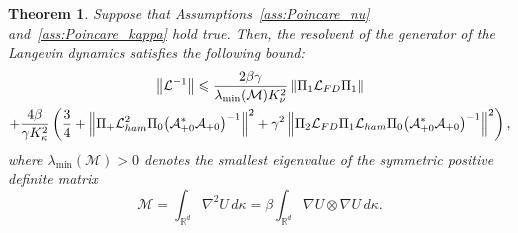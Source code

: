 \documentclass[10pt,a4paper]{article}
\newtheorem{theo}[cdrthm]{Theorem}
\numberwithin{equation}{section}
\newcommand{\cL}{\mathcal{L}}
\newcommand{\cLa}{\mathcal{A}}
\newcommand{\cLM}{\mathcal{M}}
\newcommand{\R}{\mathbb{R}}
\newcommand{\cLham}{\mathcal{L}_{\rm ham}}
\newcommand{\cLFD}{\mathcal{L}_{\rm FD}}
\newcommand{\subplus}{\textnormal{\texttt{+}}}
\renewcommand{\leq}{\leqslant}
\begin{document}
\begin{theo}
Suppose that Assumptions~\ref{ass:Poincare_nu} and~\ref{ass:Poincare_kappa} hold true. Then, the resolvent of the generator of the Langevin dynamics satisfies the following bound:
\begin{multline}\label{eq:bounds_invL_Langevin}
\left\|\cL^{-1}\right\| \leq \frac{2\beta\gamma}{\lambda_{\min}(\cLM) K_\nu^2} \left\|\Pi_1 \cLFD \Pi_1\right\| \\
+ \frac{4\beta}{\gamma K_\kappa^2} \left(\frac34 + \left\| \Pi_\subplus \cLham^2 \Pi_0 \big(\cLa_{\subplus 0}^*\cLa_{\subplus 0}\big)^{-1} \right\|^2 + \gamma^2 \left\| \Pi_2 \cLFD \Pi_1 \cLham \Pi_0 \big(\cLa_{\subplus 0}^*\cLa_{\subplus 0}\big)^{-1} \right\|^2 \right),
\end{multline}
where $\lambda_{\min}(\cLM) > 0$ denotes the smallest eigenvalue of the symmetric positive definite matrix
\[
\cLM = \int_{\R^d} \nabla^2 U \, d\kappa = \beta \int_{\R^d} \nabla U \otimes \nabla U \, d\kappa.
\]
\end{theo}
\end{document}
